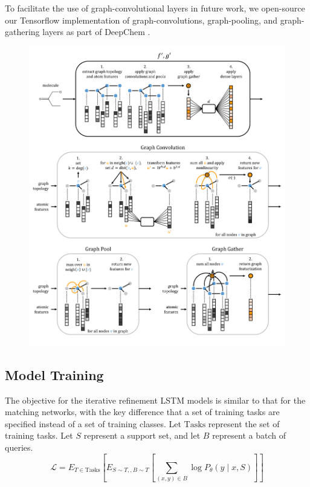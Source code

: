 \documentclass[journal=jacsat,manuscript=article]{achemso}
\begin{document}
To facilitate the use of graph-convolutional layers in future work, we open-source our Tensorflow\cite{abadi2016tensorflow} implementation of graph-convolutions, graph-pooling, and graph-gathering layers as part of DeepChem \cite{ram2016}.

\begin{figure}[H]
\includegraphics[width=\textwidth]{graphconv_graphic_v2.png}
\label{conv}
\end{figure}


\subsection{Model Training}
The objective for the iterative refinement LSTM models is similar to that for the matching networks, with the key difference that a set of training tasks are specified instead of a set of training classes. Let $\text{Tasks}$ represent the set of training tasks. Let $S$ represent a support set, and let $B$ represent a batch of queries.
\[
\mathcal{L} = E_{T\in\text{Tasks}} \left [ E_{S\sim T,, B\sim T} \left [ \sum_{(x,y) \in B} \log P_\theta(y\mid x, S) \right ] \right ]
\]
\end{document}
